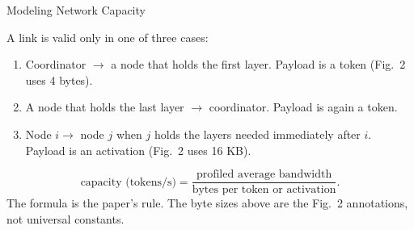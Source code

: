 \begin{frame}[t,label=mm_hx_network_01]{Modeling Network Capacity}

  \par
  \vspace{.08cm}
  {\footnotesize A link is valid only in one of three cases:}\par
  \vspace{.08cm}
  \begin{enumerate}\footnotesize
    \setlength{\itemsep}{.10cm}
    \item Coordinator \(\rightarrow\) a node that holds the first layer. Payload is a token (Fig.~2 uses 4 bytes).
    \item A node that holds the last layer \(\rightarrow\) coordinator. Payload is again a token.
    \item Node \(i\rightarrow\) node \(j\) when \(j\) holds the layers needed immediately after \(i\). Payload is an activation (Fig.~2 uses 16 KB).
  \end{enumerate}
  \vspace{.08cm}
  \[
    \text{capacity (tokens/s)}=\frac{\text{profiled average bandwidth}}{\text{bytes per token or activation}}.
  \]
  {\footnotesize The formula is the paper's rule. The byte sizes above are the Fig.~2 annotations, not universal constants.}\par
  \vspace{.12cm}
\end{frame}

